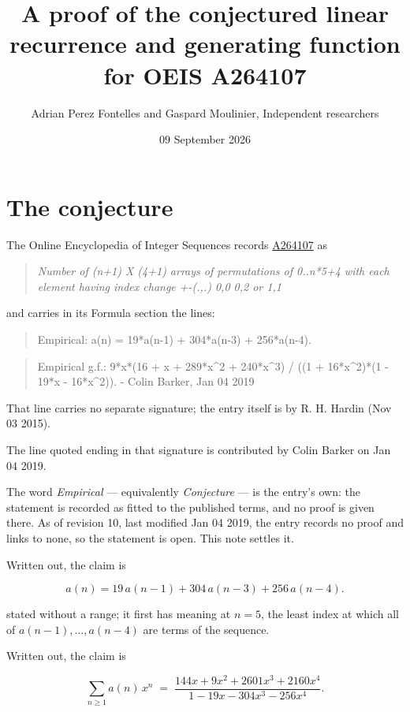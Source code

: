 \documentclass[11pt]{article}
\title{A proof of the conjectured linear recurrence and generating function for OEIS A264107}
\author{Adrian Perez Fontelles and Gaspard Moulinier, Independent researchers}
\date{09 September 2026}
\theoremstyle{definition}
\begin{document}
\maketitle
\section{The conjecture}

The Online Encyclopedia of Integer Sequences records \href{https://oeis.org/A264107}{A264107} as

\begin{quote}\itshape Number of (n+1) X (4+1) arrays of permutations of 0..n*5+4 with each element having index change +-(.,.) 0,0 0,2 or 1,1\end{quote}

and carries in its Formula section the lines:

\begin{quote}\ttfamily Empirical: a(n) = 19*a(n-1) + 304*a(n-3) + 256*a(n-4).\end{quote}

\begin{quote}\ttfamily Empirical g.f.: 9*x*(16 + x + 289*x\textasciicircum{}2 + 240*x\textasciicircum{}3) / ((1 + 16*x\textasciicircum{}2)*(1 - 19*x - 16*x\textasciicircum{}2)). - Colin Barker, Jan 04 2019\end{quote}

That line carries no separate signature; the entry itself is by R. H. Hardin (Nov 03 2015).

The line quoted ending in that signature is contributed by Colin Barker on Jan 04 2019.

The word {\itshape Empirical} --- equivalently {\itshape Conjecture} --- is the entry's own: the statement is recorded as fitted to the published terms, and no proof is given there. As of revision 10, last modified Jan 04 2019, the entry records no proof and links to none, so the statement is open. This note settles it.

Written out, the claim is

\[a(n) = 19\,a(n-1) + 304\,a(n-3) + 256\,a(n-4).\]

stated without a range; it first has meaning at $n = 5$, the least index at which all of $a(n-1),\dots,a(n-4)$ are terms of the sequence.

Written out, the claim is

\[\sum_{n \ge 1} a(n)\,x^n \;=\; \frac{144x + 9x^{2} + 2601x^{3} + 2160x^{4}}{1 - 19x - 304x^{3} - 256x^{4}}.\]
\end{document}
